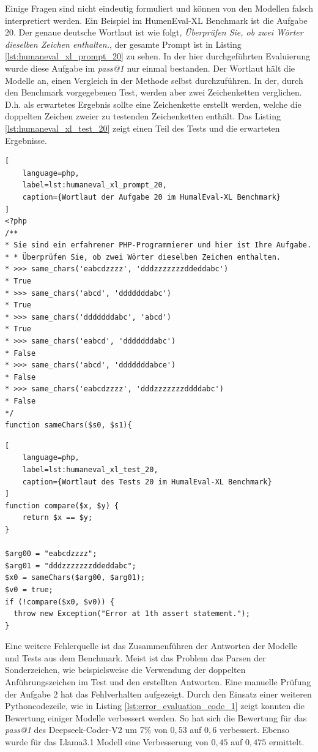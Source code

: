 Einige Fragen sind nicht eindeutig formuliert und können von den Modellen falsch interpretiert werden. Ein Beispiel im HumenEval-XL Benchmark ist die Aufgabe 20. Der genaue deutsche Wortlaut ist wie folgt, \textit{Überprüfen Sie, ob zwei Wörter dieselben Zeichen enthalten.}, der gesamte Prompt ist in Listing \ref{lst:humaneval_xl_prompt_20} zu sehen. In der hier durchgeführten Evaluierung wurde diese Aufgabe im \textit{pass@1} nur einmal bestanden. Der Wortlaut hält die Modelle an, einen Vergleich in der Methode selbst durchzuführen. In der, durch den Benchmark vorgegebenen Test, werden aber zwei Zeichenketten verglichen. D.h. als erwartetes Ergebnis sollte eine Zeichenkette erstellt werden, welche die doppelten Zeichen zweier zu testenden Zeichenketten enthält. Das Listing \ref{lst:humaneval_xl_test_20} zeigt einen Teil des Tests und die erwarteten Ergebnisse.\vspace{0.2cm}

\begin{lstlisting}[
	language=php,
	label=lst:humaneval_xl_prompt_20,
	caption={Wortlaut der Aufgabe 20 im HumalEval-XL Benchmark}
]
<?php
/**
* Sie sind ein erfahrener PHP-Programmierer und hier ist Ihre Aufgabe.
* * Überprüfen Sie, ob zwei Wörter dieselben Zeichen enthalten.
* >>> same_chars('eabcdzzzz', 'dddzzzzzzzddeddabc')
* True
* >>> same_chars('abcd', 'dddddddabc')
* True
* >>> same_chars('dddddddabc', 'abcd')
* True
* >>> same_chars('eabcd', 'dddddddabc')
* False
* >>> same_chars('abcd', 'dddddddabce')
* False
* >>> same_chars('eabcdzzzz', 'dddzzzzzzzddddabc')
* False
*/
function sameChars($s0, $s1){
\end{lstlisting}

\begin{lstlisting}[
	language=php,
	label=lst:humaneval_xl_test_20,
	caption={Wortlaut des Tests 20 im HumalEval-XL Benchmark}
]
function compare($x, $y) {
	return $x == $y;
}

$arg00 = "eabcdzzzz";
$arg01 = "dddzzzzzzzddeddabc";
$x0 = sameChars($arg00, $arg01);
$v0 = true;
if (!compare($x0, $v0)) {
  throw new Exception("Error at 1th assert statement.");
}
\end{lstlisting}

Eine weitere Fehlerquelle ist das Zusammenführen der Antworten der Modelle und Tests aus dem Benchmark. Meist ist das Problem das Parsen der Sonderzeichen, wie beispielsweise die Verwendung der doppelten Anführungszeichen im Test und den erstellten Antworten. Eine manuelle Prüfung der Aufgabe 2 hat das Fehlverhalten aufgezeigt. Durch den Einsatz einer weiteren Pythoncodezeile, wie in Listing \ref{lst:error_evaluation_code_1} zeigt konnten die Bewertung einiger Modelle verbessert werden. So hat sich die Bewertung für das \textit{pass@1} des Deepseek-Coder-V2 um 7\% von $0,53$ auf $0,6$ verbessert. Ebenso wurde für das Llama3.1 Modell eine Verbesserung von $0,45$ auf $0,475$ ermittelt.\vspace{0.2cm}

